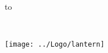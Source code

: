 \begin{titlepage}
\null\vskip-47pt
\hbox to 

\setcounter{page}{1}                      %

\vspace*{60mm}


{\selectfont
\begin{center}
 \\
\end{center}}


\begin{center}
\texttt{[image: ../Logo/lantern]}
\end{center}

\vfill
\end{titlepage}

\thispagestyle{empty}
\cleardoublepage

